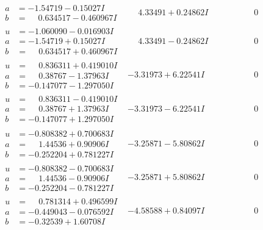 \documentclass[1p]{elsarticle_modified}
\theoremstyle{definition}
\begin{document}
$$\begin{array}{c|c|c}
\begin{aligned}
a &= -1.54719 - 0.15027 I \\
b &= \phantom{-}0.634517 - 0.460967 I\end{aligned}
 & \phantom{-}4.33491 + 0.24862 I & \phantom{-0.000000 } 0 \\ \hline\begin{aligned}
u &= -1.060090 - 0.016903 I \\
a &= -1.54719 + 0.15027 I \\
b &= \phantom{-}0.634517 + 0.460967 I\end{aligned}
 & \phantom{-}4.33491 - 0.24862 I & \phantom{-0.000000 } 0 \\ \hline\begin{aligned}
u &= \phantom{-}0.836311 + 0.419010 I \\
a &= \phantom{-}0.38767 - 1.37963 I \\
b &= -0.147077 - 1.297050 I\end{aligned}
 & -3.31973 + 6.22541 I & \phantom{-0.000000 } 0 \\ \hline\begin{aligned}
u &= \phantom{-}0.836311 - 0.419010 I \\
a &= \phantom{-}0.38767 + 1.37963 I \\
b &= -0.147077 + 1.297050 I\end{aligned}
 & -3.31973 - 6.22541 I & \phantom{-0.000000 } 0 \\ \hline\begin{aligned}
u &= -0.808382 + 0.700683 I \\
a &= \phantom{-}1.44536 + 0.90906 I \\
b &= -0.252204 + 0.781227 I\end{aligned}
 & -3.25871 - 5.80862 I & \phantom{-0.000000 } 0 \\ \hline\begin{aligned}
u &= -0.808382 - 0.700683 I \\
a &= \phantom{-}1.44536 - 0.90906 I \\
b &= -0.252204 - 0.781227 I\end{aligned}
 & -3.25871 + 5.80862 I & \phantom{-0.000000 } 0 \\ \hline\begin{aligned}
u &= \phantom{-}0.781314 + 0.496599 I \\
a &= -0.449043 - 0.076592 I \\
b &= -0.32539 + 1.60708 I\end{aligned}
 & -4.58588 + 0.84097 I & \phantom{-0.000000 } 0 \\ \hline\begin{aligned}

\end{aligned}
\end{array}$$
\end{document}
